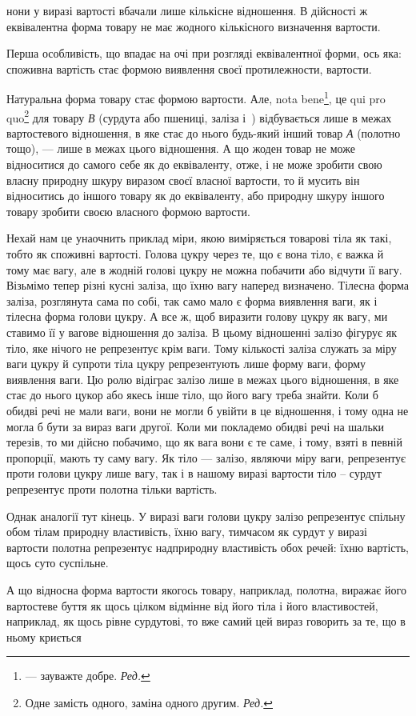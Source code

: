 \parcont{}  %
нони у виразі вартості вбачали лише кількісне відношення. В дійсності ж еквівалентна форма товару не
має жодного кількісного визначення вартости.

Перша особливість, що впадає на очі при розгляді еквівалентної форми, ось яка: споживна вартість
стає формою виявлення своєї протилежности, вартости.

Натуральна форма товару стає формою вартости. Але, nota bene\footnote*{
— зауважте добре. \emph{Ред.}
}, це qui pro quo\footnote*{
Одне замість одного, заміна одного другим. \emph{Ред.}
} для товару \emph{В}
(сурдута або пшениці, заліза і~) відбувається лише в межах вартостевого відношення, в яке стає
до нього будь-який інший товар \emph{А} (полотно тощо), — лише в межах цього відношення. А що жоден товар
не може відноситися до самого себе як до еквіваленту, отже, і не може зробити свою власну природну
шкуру виразом своєї власної вартости, то й мусить він відноситись до іншого товару як до
еквіваленту, або природну шкуру іншого товару зробити своєю власного формою вартости.

Нехай нам це унаочнить приклад міри, якою виміряється товарові тіла як такі, тобто як споживні
вартості. Голова цукру через те, що є вона тіло, є важка й тому має вагу, але в жодній голові цукру
не можна побачити або відчути її вагу. Візьмімо тепер різні кусні заліза, що їхню вагу наперед
визначено. Тілесна форма заліза, розглянута сама по собі, так само мало є форма виявлення ваги, як і
тілесна форма голови цукру. А все ж, щоб виразити голову цукру як вагу, ми ставимо її у вагове
відношення до заліза. В цьому відношенні залізо фігурує як тіло, яке нічого не репрезентує крім
ваги. Тому кількості заліза служать за міру ваги цукру й супроти тіла цукру репрезентують лише форму
ваги, форму виявлення ваги. Цю ролю відіграє залізо лише в межах цього відношення, в яке стає до
нього цукор або якесь інше тіло, що його вагу треба знайти. Коли б обидві речі не мали ваги, вони не
могли б увійти в це відношення, і тому одна не могла б бути за вираз ваги другої. Коли ми покладемо
обидві речі на шальки терезів, то ми дійсно побачимо, що як вага вони є те саме, і тому, взяті в
певній пропорції, мають ту саму вагу. Як тіло — залізо, являючи міру ваги, репрезентує проти голови
цукру лише вагу, так і в нашому виразі вартости тіло – сурдут репрезентує проти полотна тільки
вартість.

Однак аналогії тут кінець. У виразі ваги голови цукру залізо репрезентує спільну обом тілам природну
властивість, їхню вагу, тимчасом як сурдут у виразі вартости полотна репрезентує надприродну
властивість обох речей: їхню вартість, щось суто суспільне.

А що відносна форма вартости якогось товару, наприклад,
полотна, виражає його вартостеве буття як щось цілком відмінне від його тіла і його властивостей,
наприклад, як щось рівне сурдутові, то вже самий цей вираз говорить за те, що в ньому криється
\parbreak{}  %
